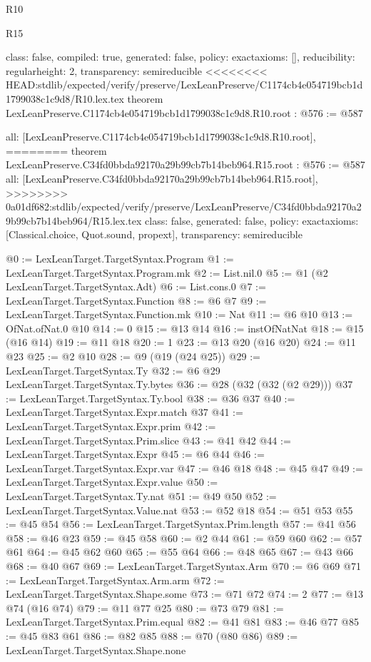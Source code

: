 \begin{lexlean}{R10}
\begin{lexlean}{R15}
\begin{coremodule}
{{{{{  class: false,
  compiled: true,
  generated: false,
  policy: exact{axioms: []},
  reducibility: regular{height: 2},
  transparency: semireducible
}
<<<<<<<< HEAD:stdlib/expected/verify/preserve/LexLeanPreserve/C1174cb4e054719bcb1d1799038c1c9d8/R10.lex.tex
theorem LexLeanPreserve.C1174cb4e054719bcb1d1799038c1c9d8.R10.root : @576 := @587 {
  all: [LexLeanPreserve.C1174cb4e054719bcb1d1799038c1c9d8.R10.root],
========
theorem LexLeanPreserve.C34fd0bbda92170a29b99cb7b14beb964.R15.root : @576 := @587 {
  all: [LexLeanPreserve.C34fd0bbda92170a29b99cb7b14beb964.R15.root],
>>>>>>>> 0a01df682:stdlib/expected/verify/preserve/LexLeanPreserve/C34fd0bbda92170a29b99cb7b14beb964/R15.lex.tex
  class: false,
  generated: false,
  policy: exact{axioms: [Classical.choice, Quot.sound, propext]},
  transparency: semireducible
}

@0 := LexLeanTarget.TargetSyntax.Program
@1 := LexLeanTarget.TargetSyntax.Program.mk
@2 := List.nil.{0}
@5 := @1 (@2 LexLeanTarget.TargetSyntax.Adt)
@6 := List.cons.{0}
@7 := LexLeanTarget.TargetSyntax.Function
@8 := @6 @7
@9 := LexLeanTarget.TargetSyntax.Function.mk
@10 := Nat
@11 := @6 @10
@13 := OfNat.ofNat.{0} @10
@14 := 0
@15 := @13 @14
@16 := instOfNatNat
@18 := @15 (@16 @14)
@19 := @11 @18
@20 := 1
@23 := @13 @20 (@16 @20)
@24 := @11 @23
@25 := @2 @10
@28 := @9 (@19 (@24 @25))
@29 := LexLeanTarget.TargetSyntax.Ty
@32 := @6 @29 LexLeanTarget.TargetSyntax.Ty.bytes
@36 := @28 (@32 (@32 (@2 @29)))
@37 := LexLeanTarget.TargetSyntax.Ty.bool
@38 := @36 @37
@40 := LexLeanTarget.TargetSyntax.Expr.match @37
@41 := LexLeanTarget.TargetSyntax.Expr.prim
@42 := LexLeanTarget.TargetSyntax.Prim.slice
@43 := @41 @42
@44 := LexLeanTarget.TargetSyntax.Expr
@45 := @6 @44
@46 := LexLeanTarget.TargetSyntax.Expr.var
@47 := @46 @18
@48 := @45 @47
@49 := LexLeanTarget.TargetSyntax.Expr.value
@50 := LexLeanTarget.TargetSyntax.Ty.nat
@51 := @49 @50
@52 := LexLeanTarget.TargetSyntax.Value.nat
@53 := @52 @18
@54 := @51 @53
@55 := @45 @54
@56 := LexLeanTarget.TargetSyntax.Prim.length
@57 := @41 @56
@58 := @46 @23
@59 := @45 @58
@60 := @2 @44
@61 := @59 @60
@62 := @57 @61
@64 := @45 @62 @60
@65 := @55 @64
@66 := @48 @65
@67 := @43 @66
@68 := @40 @67
@69 := LexLeanTarget.TargetSyntax.Arm
@70 := @6 @69
@71 := LexLeanTarget.TargetSyntax.Arm.arm
@72 := LexLeanTarget.TargetSyntax.Shape.some
@73 := @71 @72
@74 := 2
@77 := @13 @74 (@16 @74)
@79 := @11 @77 @25
@80 := @73 @79
@81 := LexLeanTarget.TargetSyntax.Prim.equal
@82 := @41 @81
@83 := @46 @77
@85 := @45 @83 @61
@86 := @82 @85
@88 := @70 (@80 @86)
@89 := LexLeanTarget.TargetSyntax.Shape.none
}}}}}
\end{coremodule}
\end{lexlean}
\end{lexlean}
